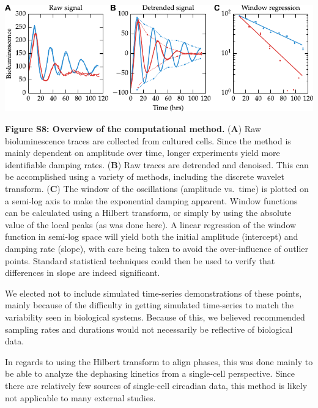 \documentclass[11pt, letterpaper]{article}
\newenvironment{manuscript}[1]{\begin{center}\begin{tcolorbox}[colback=green!5!white,colframe=green!75!black,width=\textwidth,title={#1},breakable,fonttitle=\bfseries]}{\end{tcolorbox}\end{center}}
\begin{document}
\begin{manuscript}{Page 16}
  \begin{center}
  \includegraphics[width=\textwidth]{figures/pdfs/FigS8.pdf}
  \end{center}
{\bfseries Figure S8: Overview of the computational method.} ({\bfseries A}) Raw bioluminescence traces are collected from cultured cells. Since the method is mainly dependent on amplitude over time, longer experiments yield more identifiable damping rates. ({\bfseries B}) Raw traces are detrended and denoised. This can be accomplished using a variety of methods, including the discrete wavelet transform. ({\bfseries C}) The window of the oscillations (amplitude vs.\ time) is plotted on a semi-log axis to make the exponential damping apparent. Window functions can be calculated using a Hilbert transform, or simply by using the absolute value of the local peaks (as was done here). A linear regression of the window function in semi-log space will yield both the initial amplitude (intercept) and damping rate (slope), with care being taken to avoid the over-influence of outlier points. Standard statistical techniques could then be used to verify that differences in slope are indeed significant.
\end{manuscript}

We elected not to include simulated time-series demonstrations of these points, mainly because of the difficulty in getting simulated time-series to match the variability seen in biological systems.
Because of this, we believed recommended sampling rates and durations would not necessarily be reflective of biological data.

In regards to using the Hilbert transform to align phases, this was done mainly to be able to analyze the dephasing kinetics from a single-cell perspective.
Since there are relatively few sources of single-cell circadian data, this method is likely not applicable to many external studies.


% 

\end{document}
